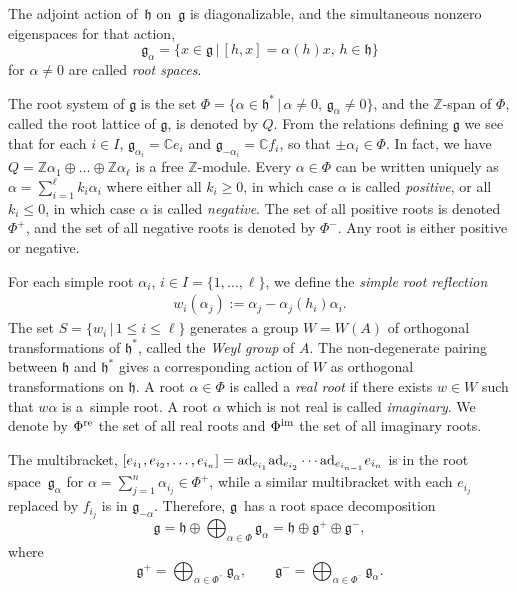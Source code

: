 \documentclass[pdftex]{sigma}
\numberwithin{equation}{section}
\def\C{{\mathbb C}}
\def\Z{\mathbb{Z}}
\def\a{\alpha}
\def\roots{{\Phi}}
\def\g{\mathfrak{g}}
\def\fg{\mathfrak{g}}
\def\h{\mathfrak{h}}
\begin{document}
The adjoint action of~$\h$ on~$\g$ is diagonalizable, and the simultaneous nonzero eigenspaces for that action,
\[\g_{\alpha} = \{x\in \g\,|\,[h,x]=\alpha(h)x,\, h\in \h\}\]
for $\alpha \neq 0$ are called {\it root spaces}.

The root system of $\g$ is the set $\roots= \{\alpha\in\h^*\, |\, \alpha \neq 0, \,\g_{\alpha}\neq 0\}$, and the $\Z$-span of $\roots$, called the
root lattice of $\g$, is denoted by $Q$. From the relations defining $\g$ we see that for each $i\in I$, $\g_{\alpha_i} = \C e_i$ and
$\g_{-\alpha_i} = \C f_i$, so that $\pm \alpha_i \in\roots$. In fact, we have
$Q=\Z\alpha_1\oplus\dots \oplus \Z\alpha_{\ell}$ is a free $\Z$-module.
Every $\alpha\in\roots$ can be written uniquely as $\alpha=\sum\limits_{i=1}^{\ell} k_i\alpha_i$ where either all $k_i\geq 0$, in which case $\alpha$ is called {\it positive}, or all $k_i\leq 0$, in which case $\alpha$ is called {\it negative}. The set of all positive roots is denoted $\roots^+$, and
the set of all negative roots is denoted by $\roots^-$. Any root is either positive or negative.

For each simple root $\alpha_i$, $i\in I=\{1,\dots, \ell\}$, we define the {\it simple root reflection}
\begin{gather}\label{equation:simple_reflection}
w_i(\alpha_j) := \alpha_j - \alpha_j(h_i)\alpha_i.
\end{gather}
The set $S = \{w_i\,|\, 1\leq i\leq\ell\}$ generates a group $W=W(A)$ of orthogonal transformations of $\h^*$, called the {\it Weyl group} of $A$. The non-degenerate pairing between $\h$ and $\h^*$ gives a corresponding action of $W$ as orthogonal transformations on $\h$. A root $\alpha\in\roots$ is called a {\it real root} if there exists $w\in W$ such that $w\alpha$ is a~simple root. A root $\alpha$ which is not real is called {\it imaginary}. We denote by $\roots^{\rm re}$ the set of all real roots and $\roots^{\rm im}$ the set of all imaginary roots.

The multibracket, $[e_{i_1},e_{i_2},\dots,e_{i_n}] = {\rm ad}_{e_{i_1}} {\rm ad}_{e_{i_2}} \cdots {\rm ad}_{e_{i_{n-1}}} e_{i_n}$ is in the root space~$\fg_\a$ for $\alpha = \sum\limits_{j=1}^n \alpha_{i_j} \in \roots^+$, while a similar multibracket with each $e_{i_j}$ replaced
by $f_{i_j}$ is in $\fg_{-\a}$. Therefore, $\g$~has a root space decomposition
\cite[Theorem~1.2]{Kac90}
\[\g = \h \oplus \bigoplus_{\alpha\in\roots} \g_{\a} = \h \oplus \g^+ \oplus \g^-,\]
where
\[\g^+ =\bigoplus_{\alpha\in\roots^{^+}}\g_{\alpha},\qquad
\g^- = \bigoplus_{\alpha\in\roots^{^-}}\g_{\alpha}.\]
\end{document}
